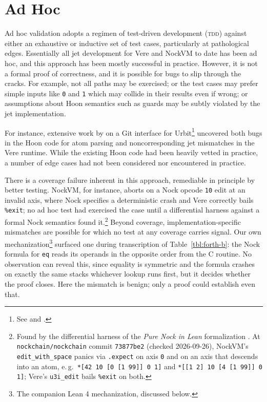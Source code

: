 \documentclass[twoside]{article}
\begin{document}
\section{Ad Hoc}\label{sec:adhoc}

Ad hoc validation adopts a regimen of test-driven development (\textsc{tdd}) against either an exhaustive or inductive set of test cases, particularly at pathological edges.  Essentially all jet development for Vere and NockVM to date has been ad hoc, and this approach has been mostly successful in practice.  However, it is not a formal proof of correctness, and it is possible for bugs to slip through the cracks.  For example, not all paths may be exercised; or the test cases may prefer simple inputs like \lstinline[style=inlinecode]{0} and \lstinline[style=inlinecode]{1} which may collide in their results even if wrong; or assumptions about Hoon semantics such as guards may be subtly violated by the jet implementation.

For instance, extensive work by  on a Git interface for Urbit\footnote{See  and .} uncovered both bugs in the Hoon code for atom parsing and noncorresponding jet mismatches in the Vere runtime.  While the existing Hoon code had been heavily vetted in practice, a number of edge cases had not been considered nor encountered in practice.

There is a coverage failure inherent in this approach, remediable in principle by better testing.  NockVM, for instance, aborts on a Nock opcode \lstinline[style=inlinecode]{10} edit at an invalid axis, where Nock specifies a deterministic crash and Vere correctly bails \lstinline[style=inlinecode]{%exit}; no ad hoc test had exercised the case until a differential harness against a formal Nock semantics found it.\footnote{Found by the differential harness of the \emph{Pure Nock in Lean} formalization \citep{PureNockLean}.  At \texttt{nockchain/nockchain} commit \texttt{73877be2} (checked 2026-09-26), NockVM's \texttt{edit\_with\_space} panics via \texttt{.expect} on axis \texttt{0} and on an axis that descends into an atom, e.\,g.\ \texttt{*[42 10 [0 [1 99]] 0 1]} and \texttt{*[[1 2] 10 [4 [1 99]] 0 1]}; Vere's \texttt{u3i\_edit} bails \texttt{\%exit} on both.}  Beyond coverage, implementation-specific mismatches are possible for which no test at any coverage carries signal.  Our own mechanization\footnote{The companion Lean 4 mechanization, discussed below.} surfaced one during transcription of Table~\ref{tbl:forth-b}:  the Nock formula for \lstinline[style=inlinecode]{eq} reads its operands in the opposite order from the C routine.  No observation can reveal this, since equality is symmetric and the formula crashes on exactly the same stacks whichever lookup runs first, but it decides whether the proof closes.  Here the mismatch is benign; only a proof could establish even that.
\end{document}
